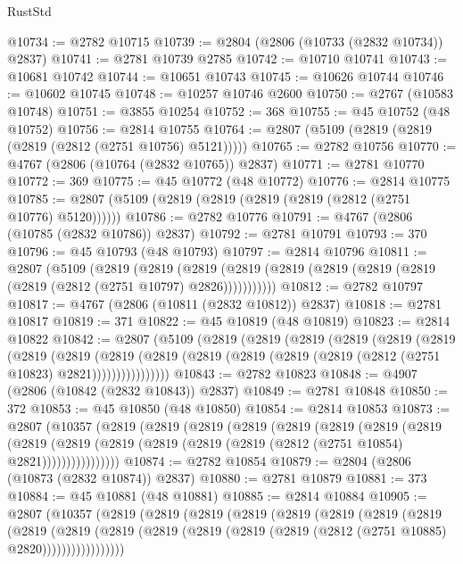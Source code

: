 \begin{lexlean}{RustStd}
\begin{coremodule}
@10734 := @2782 @10715
@10739 := @2804 (@2806 (@10733 (@2832 @10734)) @2837)
@10741 := @2781 @10739 @2785
@10742 := @10710 @10741
@10743 := @10681 @10742
@10744 := @10651 @10743
@10745 := @10626 @10744
@10746 := @10602 @10745
@10748 := @10257 @10746 @2600
@10750 := @2767 (@10583 @10748)
@10751 := @3855 @10254
@10752 := 368
@10755 := @45 @10752 (@48 @10752)
@10756 := @2814 @10755
@10764 := @2807 (@5109 (@2819 (@2819 (@2819 (@2812 (@2751 @10756) @5121)))))
@10765 := @2782 @10756
@10770 := @4767 (@2806 (@10764 (@2832 @10765)) @2837)
@10771 := @2781 @10770
@10772 := 369
@10775 := @45 @10772 (@48 @10772)
@10776 := @2814 @10775
@10785 := @2807 (@5109 (@2819 (@2819 (@2819 (@2819 (@2812 (@2751 @10776) @5120))))))
@10786 := @2782 @10776
@10791 := @4767 (@2806 (@10785 (@2832 @10786)) @2837)
@10792 := @2781 @10791
@10793 := 370
@10796 := @45 @10793 (@48 @10793)
@10797 := @2814 @10796
@10811 := @2807
    (@5109
      (@2819
        (@2819
          (@2819 (@2819 (@2819 (@2819 (@2819 (@2819 (@2819 (@2812 (@2751 @10797) @2826)))))))))))
@10812 := @2782 @10797
@10817 := @4767 (@2806 (@10811 (@2832 @10812)) @2837)
@10818 := @2781 @10817
@10819 := 371
@10822 := @45 @10819 (@48 @10819)
@10823 := @2814 @10822
@10842 := @2807
    (@5109
      (@2819
        (@2819
          (@2819
            (@2819
              (@2819
                (@2819
                  (@2819
                    (@2819
                      (@2819
                        (@2819
                          (@2819 (@2819 (@2819 (@2819 (@2812 (@2751 @10823) @2821))))))))))))))))
@10843 := @2782 @10823
@10848 := @4907 (@2806 (@10842 (@2832 @10843)) @2837)
@10849 := @2781 @10848
@10850 := 372
@10853 := @45 @10850 (@48 @10850)
@10854 := @2814 @10853
@10873 := @2807
    (@10357
      (@2819
        (@2819
          (@2819
            (@2819
              (@2819
                (@2819
                  (@2819
                    (@2819
                      (@2819
                        (@2819
                          (@2819 (@2819 (@2819 (@2819 (@2812 (@2751 @10854) @2821))))))))))))))))
@10874 := @2782 @10854
@10879 := @2804 (@2806 (@10873 (@2832 @10874)) @2837)
@10880 := @2781 @10879
@10881 := 373
@10884 := @45 @10881 (@48 @10881)
@10885 := @2814 @10884
@10905 := @2807
    (@10357
      (@2819
        (@2819
          (@2819
            (@2819
              (@2819
                (@2819
                  (@2819
                    (@2819
                      (@2819
                        (@2819
                          (@2819
                            (@2819 (@2819 (@2819 (@2819 (@2812 (@2751 @10885) @2820)))))))))))))))))

\end{coremodule}
\end{lexlean}
